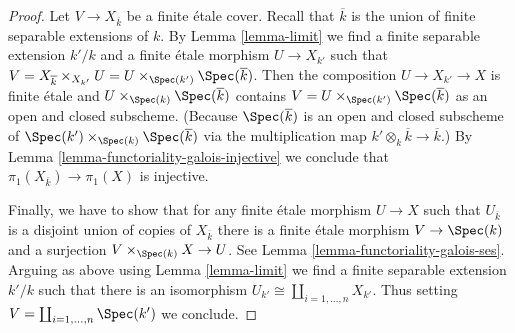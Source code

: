 \begin{proof}
\medskip\noindent
Let $V \to X_{\overline{k}}$ be a finite \'etale cover. Recall that
$\overline{k}$ is the union of finite separable extensions of $k$.
By Lemma \ref{lemma-limit} we find a finite separable extension $k'/k$
and a finite \'etale morphism $U \to X_{k'}$ such that
$V = X_{\overline{k}} \times_{X_{k'}} U =
U \times_{\Spec(k')} \Spec(\overline{k})$.
Then the composition $U \to X_{k'} \to X$ is finite \'etale
and $U \times_{\Spec(k)} \Spec(\overline{k})$
contains $V = U \times_{\Spec(k')} \Spec(\overline{k})$
as an open and closed subscheme. (Because $\Spec(\overline{k})$
is an open and closed subscheme of
$\Spec(k') \times_{\Spec(k)} \Spec(\overline{k})$ via
the multiplication map $k' \otimes_k \overline{k} \to \overline{k}$.) By
Lemma \ref{lemma-functoriality-galois-injective}
we conclude that $\pi_1(X_{\overline{k}}) \to \pi_1(X)$ is injective.

\medskip\noindent
Finally, we have to show that for any finite \'etale morphism
$U \to X$ such that $U_{\overline{k}}$ is a disjoint union
of copies of $X_{\overline{k}}$ there is a finite \'etale
morphism $V \to \Spec(k)$ and a surjection $V \times_{\Spec(k)} X \to U$.
See Lemma \ref{lemma-functoriality-galois-ses}.
Arguing as above using Lemma \ref{lemma-limit}
we find a finite separable extension $k'/k$
such that there is an isomorphism
$U_{k'} \cong \coprod_{i = 1, \ldots, n} X_{k'}$.
Thus setting $V = \coprod_{i = 1, \ldots, n} \Spec(k')$
we conclude.
\end{proof}